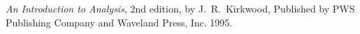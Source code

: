 \documentclass[12pt]{etsu_thesis}
\begin{document}
\begin{thebibliography}{99}

 {\it An Introduction to Analysis}, 2nd edition, by J.\ R.\ Kirkwood, Published by PWS Publishing Company and Waveland Press, Inc. 1995. 


\end{thebibliography}













\newpage
{}

\newpage
\end{document}
